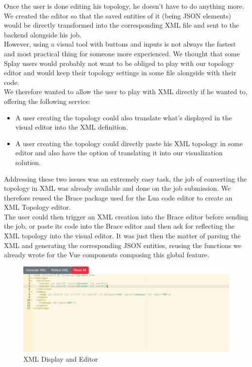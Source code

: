 \documentclass{eplmastersthesis}
\begin{document}
        Once the user is done editing his topology, he doesn't have to
        do anything more. We created the editor so that the saved entities
        of it (being JSON elements) would be directly transformed into the
        corresponding XML file and sent to the backend alongside his
        job.\\

        However, using a visual tool with buttons and inputs is not always
        the fastest and most practical thing for someone more experienced. We
        thought that some Splay users would probably not want to be obliged
        to play with our topology editor and would keep their topology
        settings in some file alongside with their code.\\
        We therefore wanted to allow the user to play with XML directly
        if he wanted to, offering the following service:

        \begin{itemize}
          \item A user creating the topology could also translate what's
          displayed in the visual editor into the XML definition.
          \item A user creating the topology could directly paste
          his XML topology in some editor and also have the option of
          translating it into our visualization solution.
        \end{itemize}

        Addressing these two issues was an extremely easy task, the job of
        converting the topology in XML was already available and done on
        the job submission. We therefore reused the Brace package used
        for the Lua code editor to create an XML Topology editor.\\
        The user could then trigger an XML creation into the Brace editor
        before sending the job, or paste its code into the Brace editor and
        then ask for reflecting the XML topology into the visual editor. It
        was just then the matter of parsing the XML and generating the
        corresponding JSON entities, reusing the functions we already wrote
        for the Vue components composing this global feature.

        \begin{figure}[H]
          \centering
          \includegraphics[scale=0.5]{figures/xml_topology.png}
          \caption{\label{xml_topology} XML Display and Editor}
        \end{figure}
\end{document}

